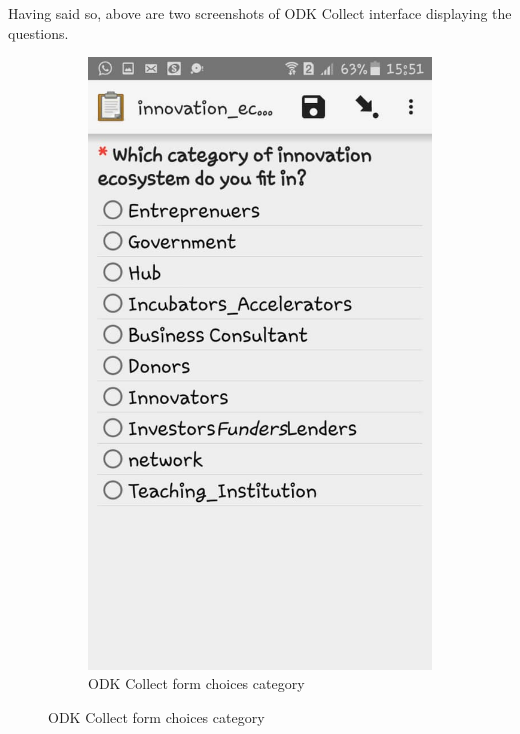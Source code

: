 \documentclass[a4paper,12pt,twoside]{article}
\begin{document}
Having said so, above are two screenshots of ODK Collect interface displaying the questions.
\begin{figure}
\centering
  \begin{subfigure}[b]{0.3\textwidth}
    \includegraphics[width=\textwidth]{images/ODK_1.jpeg}
     \color{OMDTZgreen}\caption{ODK Collect form choices category}
    \label{fig:1}
  \end{subfigure} \hspace{10mm} %

\end{figure}
\end{document}
